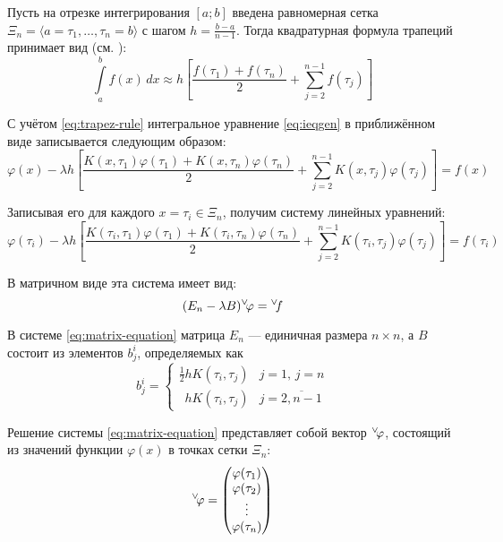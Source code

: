 \documentclass[11pt]{article}
\numberwithin{equation}{section}
\renewcommand{\phi}{\varphi}
\newcommand{\intl}{\int\limits}
\renewcommand{\vec}[1]{{}^{\vee}\negmedspace#1}
\begin{document}
Пусть на отрезке интегрирования $[a; b]$ введена равномерная сетка
$\Xi_n = \langle a = \tau_1, \dotsc, \tau_n = b \rangle$ с шагом
$h = \frac{b-a}{n-1}$. Тогда квадратурная формула трапеций принимает
вид (см. \cite{bakhvalov01}):
\begin{equation}
  \label{eq:trapez-rule}
  \intl_a^b{f(x)\,dx} \approx h \left [ \frac{f(\tau_1)+f(\tau_n)}{2} +
    \sum_{j=2}^{n-1} f(\tau_j) \right ]
\end{equation}

С учётом \eqref{eq:trapez-rule} интегральное уравнение
\eqref{eq:ieqgen} в приближённом виде записывается следующим образом:
\begin{equation*}
  \phi(x) - \lambda h \left[ 
    \frac{K(x,\tau_1) \phi(\tau_1) + 
      K(x,\tau_n) \phi(\tau_n)}{2} + 
    \sum_{j=2}^{n-1} K(x, \tau_{j}) \phi(\tau_{j}) 
  \right] = f(x)
\end{equation*}

Записывая его для каждого $x = \tau_i \in \Xi_n$, получим систему линейных
уравнений:
\begin{equation*}
  \phi(\tau_i) - \lambda h \left[ 
    \frac{K(\tau_i,\tau_1) \phi(\tau_1) + 
      K(\tau_i,\tau_n) \phi(\tau_n)}{2} + 
    \sum_{j=2}^{n-1} K(\tau_i, \tau_{j}) \phi(\tau_{j}) 
  \right] = f(\tau_i)
\end{equation*}

В матричном виде эта система имеет вид:
\begin{equation}
  \label{eq:matrix-equation}
  (E_n-\lambda B) \vec{\phi} = \vec{f}
\end{equation}

В системе \eqref{eq:matrix-equation} матрица $E_n$ — единичная размера
$n×n$, а $B$ состоит из элементов $b_j^i$, определяемых как
\begin{equation}
  \label{eq:B-matrix-element}
  b_j^i =
  \begin{cases}
    \frac{1}{2}hK(\tau_i, \tau_j) & j = 1,\, j = n \\
    \phantom{\frac{1}{2}} hK(\tau_i, \tau_j) & j = \overline{2,n-1}
  \end{cases}
\end{equation}

Решение системы \eqref{eq:matrix-equation} представляет собой вектор
$\vec{\phi}$, состоящий из значений функции $\phi(x)$ в точках сетки
$\Xi_n$:
\begin{equation}
  \label{eq:num-solution}
  \vec{\phi} = 
  \begin{pmatrix}
    \phi(\tau_1) \\
    \phi(\tau_2) \\
    \vdots \\
    \phi(\tau_n)
  \end{pmatrix}
\end{equation}
\end{document}
